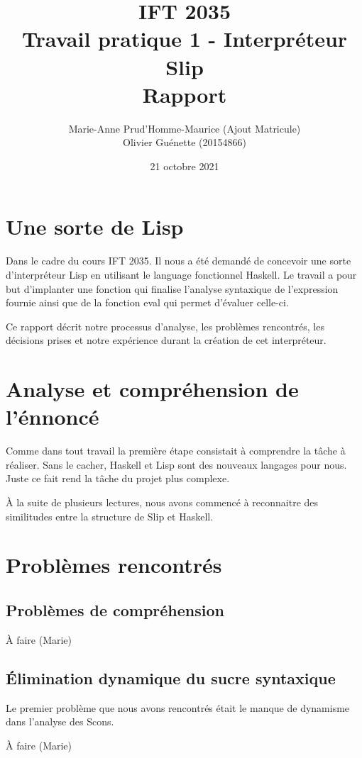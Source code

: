 \documentclass[12pt, letterpaper]{article}
\title{IFT 2035 \\ Travail pratique 1 - Interpréteur Slip \\ Rapport }
\author{ Marie-Anne Prud'Homme-Maurice (Ajout Matricule) 
\\ Olivier Guénette (20154866)}
\date{21 octobre 2021}
\begin{document}
\maketitle

\section*{Une sorte de Lisp}

Dans le cadre du cours IFT 2035. Il nous a été demandé de concevoir une sorte
d'interpréteur Lisp en utilisant le language fonctionnel Haskell. Le travail
a pour but d'implanter une fonction qui finalise l'analyse syntaxique de
l'expression fournie ainsi que de la fonction eval qui permet d'évaluer
celle-ci.

Ce rapport décrit notre processus d'analyse, les problèmes rencontrés,
les décisions prises et notre expérience durant la création de
cet interpréteur.

\section*{Analyse et compréhension de l'énnoncé}

Comme dans tout travail la première étape consistait à comprendre la tâche à
réaliser.  Sans le cacher, Haskell et Lisp sont des nouveaux langages pour nous.
Juste ce fait rend la tâche du projet plus complexe.

À la suite de plusieurs lectures, nous avons commencé à reconnaitre des 
similitudes entre la structure de Slip et Haskell.

\section*{Problèmes rencontrés}

\subsection*{Problèmes de compréhension}

À faire (Marie)

\subsection*{Élimination dynamique du sucre syntaxique}
Le premier problème que nous avons rencontrés était le manque de dynamisme
dans l'analyse des Scons.

À faire (Marie)
\end{document}
